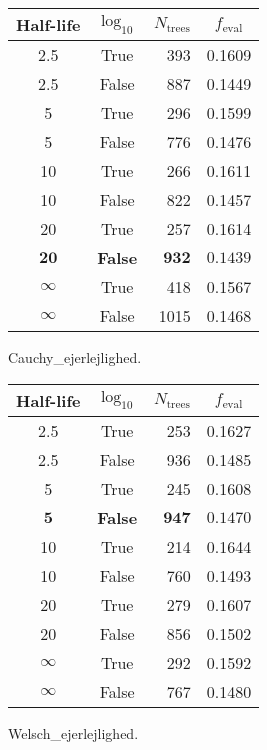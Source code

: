 \begin{margintable}
  \begin{tabular}{@{}ccrc@{}}
    Half-life & $\log_{10}$ & $N_\mathrm{trees}$ & $f_\mathrm{eval}$ \\
    \midrule
    \num{2.5} & True & \num{393} & \num{0.1609} \\
    \num{2.5} & False & \num{887} & \num{0.1449} \\
    \num{5} & True & \num{296} & \num{0.1599} \\
    \num{5} & False & \num{776} & \num{0.1476} \\
    \num{10} & True & \num{266} & \num{0.1611} \\
    \num{10} & False & \num{822} & \num{0.1457} \\
    \num{20} & True & \num{257} & \num{0.1614} \\
    $\mathbf{20}$ & \textbf{False} & $\mathbf{932}$ & $\mathbf{0.1439}$ \\
    $\infty$ & True & \num{418} & \num{0.1567} \\
    $\infty$ & False & \num{1015} & \num{0.1468} \\
  \end{tabular}
  \caption{\label{tab:h:HPO_initial_Cauchy_ejerlejlighed}Cauchy_ejerlejlighed.}
\end{margintable}

\begin{margintable}
  \begin{tabular}{@{}ccrc@{}}
    Half-life & $\log_{10}$ & $N_\mathrm{trees}$ & $f_\mathrm{eval}$ \\
    \midrule
    \num{2.5} & True & \num{253} & \num{0.1627} \\
    \num{2.5} & False & \num{936} & \num{0.1485} \\
    \num{5} & True & \num{245} & \num{0.1608} \\
    $\mathbf{5}$ & \textbf{False} & $\mathbf{947}$ & $\mathbf{0.1470}$ \\
    \num{10} & True & \num{214} & \num{0.1644} \\
    \num{10} & False & \num{760} & \num{0.1493} \\
    \num{20} & True & \num{279} & \num{0.1607} \\
    \num{20} & False & \num{856} & \num{0.1502} \\
    $\infty$ & True & \num{292} & \num{0.1592} \\
    $\infty$ & False & \num{767} & \num{0.1480} \\
  \end{tabular}
  \caption{\label{tab:h:HPO_initial_Welsch_ejerlejlighed}Welsch_ejerlejlighed.}
\end{margintable}

